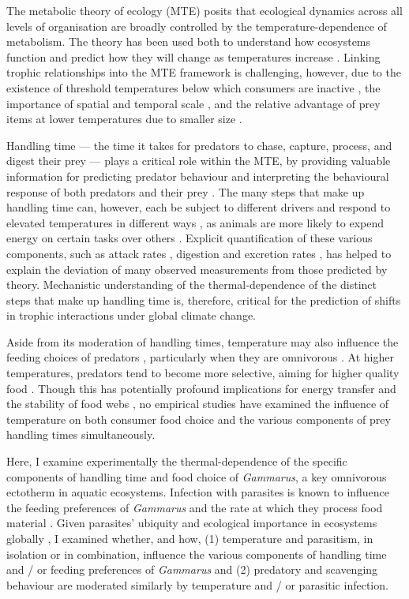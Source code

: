 The metabolic theory of ecology (MTE) \citep{brown2004} posits that ecological dynamics across all levels of organisation are broadly controlled by the temperature-dependence of metabolism. The theory has been used both to understand how ecosystems function \citep{ohlund2015, sentis2015, ogorman2017} and predict how they will change as temperatures increase \citep{oconnor2009, petchey2010}. Linking trophic relationships into the MTE framework is challenging, however, due to the existence of threshold temperatures below which consumers are inactive \citep{ohlund2015}, the importance of spatial and temporal scale \citep{kordas2011}, and the relative advantage of prey items at lower temperatures due to smaller size \citep{dell2011}.

Handling time --- the time it takes for predators to chase, capture, process, and digest their prey \citep{jeschke2002} --- plays a critical role within the MTE, by providing valuable information for predicting predator behaviour and interpreting the behavioural response of both predators and their prey \citep{rall2012, reuman2014}. The many steps that make up handling time can, however, each be subject to different drivers and respond to elevated temperatures in different ways \citep{sentis2013}, as animals are more likely to expend energy on certain tasks over others \citep{dell2011}. Explicit quantification of these various components, such as attack rates \citep{ohlund2015}, digestion \citep{sentis2013} and excretion rates \citep{rall2010, enlund2011}, has helped to explain the deviation of many observed measurements from those predicted by theory. Mechanistic understanding of the thermal-dependence of the distinct steps that make up handling time is, therefore, critical for the prediction of shifts in trophic interactions under global climate change. 

Aside from its moderation of handling times, temperature may also influence the feeding choices of predators \citep{ferrari2015}, particularly when they are omnivorous  \citep{boersma2016}. At higher temperatures, predators tend to become more selective, aiming for higher quality food \citep{gordon2018}. Though this has potentially profound implications for energy transfer and the stability of food webs \citep{ogorman2016}, no empirical studies have examined the influence of temperature on both consumer food choice and the various components of prey handling times simultaneously. 

Here, I examine experimentally the thermal-dependence of the specific components of handling time and food choice of \emph{Gammarus}, a key omnivorous ectotherm in aquatic ecosystems. Infection with parasites is known to influence the feeding preferences of \emph{Gammarus} \citep{bunke2015} and the rate at which they process food material \citep{labaude2016}. Given parasites' ubiquity and ecological importance in ecosystems globally \citep{poulin2018the}, I examined whether, and how, (1) temperature and parasitism, in isolation or in combination, influence the various components of handling time and / or feeding preferences of \emph{Gammarus} and (2) predatory and scavenging behaviour are moderated similarly by temperature and / or parasitic infection. 

